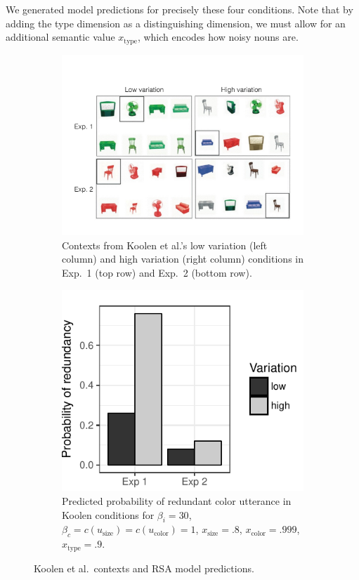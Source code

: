 \documentclass[11pt]{article}
\begin{document}
We generated model predictions for precisely these four conditions. Note that by adding the type dimension as a distinguishing dimension, we must allow for an additional semantic value $x_{\text{type}}$, which encodes how noisy nouns are.

\begin{figure}
\begin{subfigure}{.5\textwidth}
\includegraphics[width=\textwidth]{pics/koolen-conditions}
\caption{Contexts from Koolen et al.'s low variation (left column) and high variation (right column) conditions in Exp.~1 (top row) and Exp.~2 (bottom row).}
\label{fig:koolencontexts}
\end{subfigure}
\begin{subfigure}{.5\textwidth}
\centering
\includegraphics[width=.75\textwidth]{pics/koolen-effect}
\caption{Predicted probability of redundant color utterance in Koolen conditions for $\beta_i = 30$, $ \beta_c = c(u_{\textrm{size}}) = c(u_{\textrm{color}}) = 1$, $x_{\text{size}} = .8$, $x_{\text{color}} = .999$, $x_{\text{type}} = .9$.}
\label{fig:koolensimulationresults}
\end{subfigure}
\caption{Koolen et al.~contexts and RSA model predictions.}
\end{figure}
\end{document}
